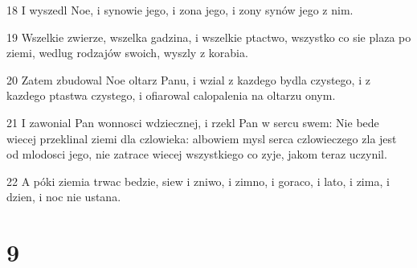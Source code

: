 \par 18 I wyszedl Noe, i synowie jego, i zona jego, i zony synów jego z nim.
\par 19 Wszelkie zwierze, wszelka gadzina, i wszelkie ptactwo, wszystko co sie plaza po ziemi, wedlug rodzajów swoich, wyszly z korabia.
\par 20 Zatem zbudowal Noe oltarz Panu, i wzial z kazdego bydla czystego, i z kazdego ptastwa czystego, i ofiarowal calopalenia na oltarzu onym.
\par 21 I zawonial Pan wonnosci wdziecznej, i rzekl Pan w sercu swem: Nie bede wiecej przeklinal ziemi dla czlowieka: albowiem mysl serca czlowieczego zla jest od mlodosci jego, nie zatrace wiecej wszystkiego co zyje, jakom teraz uczynil.
\par 22 A póki ziemia trwac bedzie, siew i zniwo, i zimno, i goraco, i lato, i zima, i dzien, i noc nie ustana.

\chapter{9}

